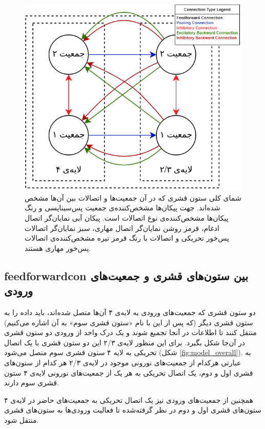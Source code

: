 \documentclass[12pt]{report}
\begin{document}
	\begin{figure}[]
		\centering
		\includegraphics[width=0.9\linewidth]{model_cc.png}
		\caption[NS]{
			شمای کلی ستون قشری که در آن جمعیت‌ها و اتصالات بین آن‌ها مشخص شده‌اند. جهت پیکان‌ها مشخص‌کننده‌ی جمعیت پس‌سیناپسی و رنگ پیکان‌ها مشخص‌کننده‌ی نوع اتصالات است. پیکان آبی نمایان‌گر اتصال ادغام، قرمز روشن نمایان‌گر اتصال مهاری، سبز نمایان‌گر اتصالات پس‌خور تحریکی و  اتصالات با رنگ قرمز تیره مشخص‌کننده‌ی اتصالات پس‌خور مهاری هستند.
		}
		\label{fig:model_cc} 
	\end{figure}
	
	
	\subsection{\gls{feedforwardcon} بین ستون‌های قشری و جمعیت‌های ورودی}
	
	دو ستون قشری‌ که جمعیت‌های ورودی به لایه‌ی ۴ آن‌ها متصل شده‌اند، باید داده را به ستون قشری دیگر (که پس از این با نام «ستون قشری سوم» به آن اشاره می‌کنیم) منتقل کنند تا اطلاعات در آنجا تجمیع شوند و یک درک واحد از ورودی دو ستون قشری در آن‌جا شکل بگیرد. برای این منظور لایه‌ی ۲/۳ این دو ستون قشری با یک اتصال تحریکی به لایه ۴ ستون قشری سوم متصل می‌شود (شکل \ref{fig:model_overall}). به عبارتی هرکدام از جمعیت‌های نورونی موجود در لایه‌ی ۲/۳ هر کدام از ستون‌های قشری اول و دوم، یک اتصال تحریکی به هر‌ یک از جمعیت‌های نورونی لایه‌ی ۴ ستون قشری سوم دارند. 
	
	همچنین از جمعیت‌های ورودی نیز یک اتصال تحریکی به جمعیت‌های حاضر در لایه‌ی ۴ ستون‌های قشری اول و دوم در نظر گرفته‌شده تا فعالیت ورودی‌ها به ستون‌های قشری منتقل شود.
	
\end{document}
